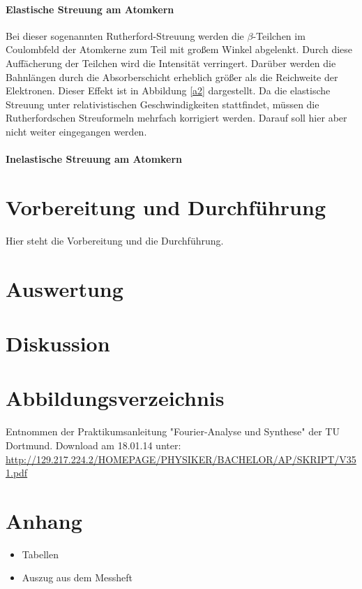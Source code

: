 \documentclass[11pt,ngerman,a4paper]{article}
\begin{document}
\paragraph{Elastische Streuung am Atomkern}
Bei dieser sogenannten Rutherford-Streuung werden die $\beta$-Teilchen im Coulombfeld der Atomkerne zum Teil mit großem Winkel abgelenkt. Durch diese Auffächerung der Teilchen wird die Intensität verringert. Darüber werden die Bahnlängen durch die Absorberschicht erheblich größer als die Reichweite der Elektronen. Dieser Effekt ist in Abbildung \ref{a2} dargestellt. Da die elastische Streuung unter relativistischen Geschwindigkeiten stattfindet, müssen die Rutherfordschen Streuformeln mehrfach korrigiert werden. Darauf soll hier aber nicht weiter eingegangen werden.
\paragraph{Inelastische Streuung am Atomkern}

\section{Vorbereitung und Durchf\"{u}hrung}
Hier steht die Vorbereitung und die Durchführung.

\section{Auswertung}

\section{Diskussion}

\section{Abbildungsverzeichnis}
\begin{enumerate}[{[}1{]}]
\item Entnommen der Praktikumsanleitung "Fourier-Analyse und Synthese" der TU Dortmund. Download am 18.01.14 unter:\\
 \url{http://129.217.224.2/HOMEPAGE/PHYSIKER/BACHELOR/AP/SKRIPT/V351.pdf}
\end{enumerate}
\section{Anhang}
\begin{itemize}
\item Tabellen
\item Auszug aus dem Messheft
\end{itemize}
\end{document}
